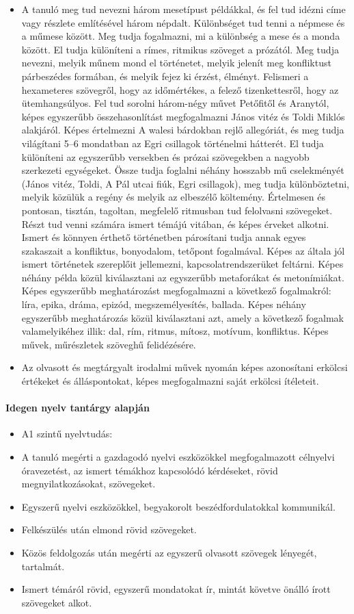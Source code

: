 \begin{itemize}
\item A tanuló meg tud nevezni három mesetípust példákkal, és fel tud idézni címe vagy részlete említésével három népdalt. Különbséget tud tenni a népmese és a műmese között. Meg tudja fogalmazni, mi a különbség a mese és a monda között. El tudja különíteni a rímes, ritmikus szöveget a prózától. Meg tudja nevezni, melyik műnem mond el történetet, melyik jelenít meg konfliktust párbeszédes formában, és melyik fejez ki érzést, élményt. Felismeri a hexameteres szövegről, hogy az időmértékes, a felező tizenkettesről, hogy az ütemhangsúlyos. Fel tud sorolni három-négy művet Petőfitől és Aranytól, képes egyszerűbb összehasonlítást megfogalmazni János vitéz és Toldi Miklós alakjáról. Képes értelmezni A walesi bárdokban rejlő allegóriát, és meg tudja világítani 5–6 mondatban az Egri csillagok történelmi hátterét. El tudja különíteni az egyszerűbb versekben és prózai szövegekben a nagyobb szerkezeti egységeket. Össze tudja foglalni néhány hosszabb mű cselekményét (János vitéz, Toldi, A Pál utcai fiúk, Egri csillagok), meg tudja különböztetni, melyik közülük a regény és melyik az elbeszélő költemény. Értelmesen és pontosan, tisztán, tagoltan, megfelelő ritmusban tud felolvasni szövegeket. Részt tud venni számára ismert témájú vitában, és képes érveket alkotni. Ismert és könnyen érthető történetben párosítani tudja annak egyes szakaszait a konfliktus, bonyodalom, tetőpont fogalmával. Képes az általa jól ismert történetek szereplőit jellemezni, kapcsolatrendszerüket feltárni. Képes néhány példa közül kiválasztani az egyszerűbb metaforákat és metonímiákat. Képes egyszerűbb meghatározást megfogalmazni a következő fogalmakról: líra, epika, dráma, epizód, megszemélyesítés, ballada. Képes néhány egyszerűbb meghatározás közül kiválasztani azt, amely a következő fogalmak valamelyikéhez illik: dal, rím, ritmus, mítosz, motívum, konfliktus. Képes művek, műrészletek szöveghű felidézésére.
\item Az olvasott és megtárgyalt irodalmi művek nyomán képes azonosítani erkölcsi értékeket és álláspontokat, képes megfogalmazni saját erkölcsi ítéleteit.
\end{itemize}
\paragraph{Idegen nyelv tantárgy alapján}
\begin{itemize}
\item A1 szintű nyelvtudás:
\item A tanuló megérti a gazdagodó nyelvi eszközökkel megfogalmazott célnyelvi óravezetést, az ismert témákhoz kapcsolódó kérdéseket, rövid megnyilatkozásokat, szövegeket.
\item Egyszerű nyelvi eszközökkel, begyakorolt beszédfordulatokkal kommunikál.
\item Felkészülés után elmond rövid szövegeket.
\item Közös feldolgozás után megérti az egyszerű olvasott szövegek lényegét, tartalmát.
\item Ismert témáról rövid, egyszerű mondatokat ír, mintát követve önálló írott szövegeket alkot.
\end{itemize}
